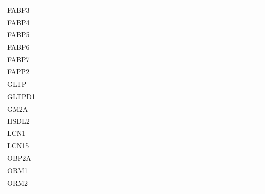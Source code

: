 \begin{tabular}{lllllllllllllllllllllllllllllllll}
FABP3 &  &  &  &  &  &  &  &  & \cellcolor{emblgreen!75} &  &  &  &  &  &  &  &  &  &  &  &  &  &  &  &  &  &  &  &  &  &  & \\
FABP4 &  &  &  &  &  &  &  &  & \cellcolor{emblgreen!75} &  &  &  &  &  &  &  &  &  &  &  &  &  &  &  &  &  &  &  &  & \cellcolor{emblgreen!75} &  & \\
FABP5 &  &  &  &  &  &  &  &  & \cellcolor{emblgreen!75} &  &  &  &  &  &  &  &  &  &  &  &  &  &  &  &  &  &  &  &  & \cellcolor{emblgreen!75} &  & \\
FABP6 & \cellcolor{emblgreen!75} & \cellcolor{emblgreen!75} &  &  &  &  &  &  & \cellcolor{emblgreen!75} &  &  &  &  &  &  &  &  &  &  &  &  &  &  &  &  &  &  &  &  &  &  & \\
FABP7 &  &  &  &  &  &  &  &  & \cellcolor{emblgreen!75} &  &  &  &  &  &  &  &  &  &  &  &  &  &  &  &  &  &  &  &  &  &  & \\
FAPP2 &  &  &  &  & \cellcolor{emblgreen!75} &  &  &  &  &  &  &  &  &  &  &  &  &  &  &  &  &  &  &  &  &  &  &  &  &  &  & \\
GLTP &  &  &  &  & \cellcolor{emblgreen!75} &  &  &  &  &  &  &  &  &  &  &  &  &  &  &  &  &  &  &  &  &  &  &  &  &  &  & \\
GLTPD1 &  &  &  &  &  & \cellcolor{emblgreen!75} &  &  &  &  &  &  &  &  &  &  &  &  &  &  &  &  &  &  &  &  &  &  &  &  &  & \\
GM2A &  &  &  &  &  &  &  &  &  & \cellcolor{emblgreen!75} &  &  &  &  &  &  & \cellcolor{emblgreen!75} & \cellcolor{emblgreen!75} & \cellcolor{emblgreen!75} &  &  &  &  &  &  &  &  &  &  &  &  & \\
HSDL2 &  &  &  &  &  &  &  &  &  &  &  &  &  &  &  &  &  &  &  &  &  &  &  &  &  &  &  &  &  &  &  & \\
LCN1 &  &  & \cellcolor{emblgreen!75} &  &  &  &  &  & \cellcolor{emblgreen!75} &  &  &  &  &  &  &  &  &  & \cellcolor{emblgreen!75} &  &  &  &  &  &  &  &  & \cellcolor{emblgreen!75} &  & \cellcolor{emblgreen!75} &  & \\
LCN15 &  &  &  &  &  &  &  &  &  &  &  &  &  &  &  &  &  &  &  &  &  &  &  &  &  &  &  &  &  &  &  & \\
OBP2A &  &  &  &  &  &  &  &  & \cellcolor{emblgreen!75} &  &  &  &  &  &  &  &  &  &  &  &  &  &  &  &  &  &  &  &  &  &  & \\
ORM1 &  &  &  &  &  &  &  &  &  &  &  &  &  &  & \cellcolor{emblgreen!75} &  &  &  &  &  &  &  &  &  &  &  &  &  &  &  &  & \\
ORM2 &  &  &  &  &  &  &  &  &  &  &  &  &  &  &  &  &  &  &  &  &  &  &  &  &  &  &  &  &  &  &  & \\
\end{tabular}
